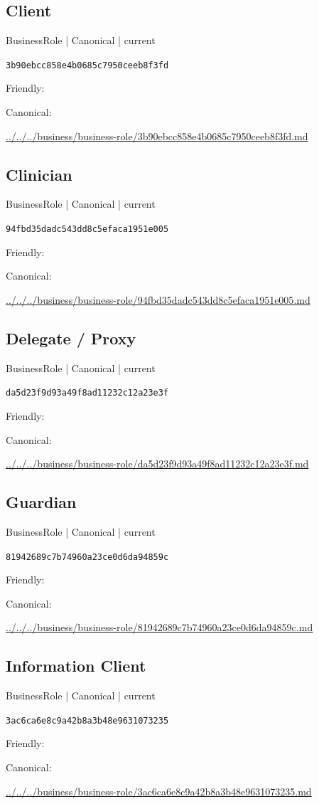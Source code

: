\documentclass[10pt,a4paper]{article}
\begin{document}
\subsection*{Client}
{\small BusinessRole | Canonical | current}\par
\texttt{3b90ebcc858e4b0685c7950ceeb8f3fd}\par
Friendly: \par
Canonical: \par
{\footnotesize\url{../../../business/business-role/3b90ebcc858e4b0685c7950ceeb8f3fd.md}}\par
\subsection*{Clinician}
{\small BusinessRole | Canonical | current}\par
\texttt{94fbd35dadc543dd8c5efaca1951e005}\par
Friendly: \par
Canonical: \par
{\footnotesize\url{../../../business/business-role/94fbd35dadc543dd8c5efaca1951e005.md}}\par
\subsection*{Delegate / Proxy}
{\small BusinessRole | Canonical | current}\par
\texttt{da5d23f9d93a49f8ad11232c12a23e3f}\par
Friendly: \par
Canonical: \par
{\footnotesize\url{../../../business/business-role/da5d23f9d93a49f8ad11232c12a23e3f.md}}\par
\subsection*{Guardian}
{\small BusinessRole | Canonical | current}\par
\texttt{81942689c7b74960a23ce0d6da94859c}\par
Friendly: \par
Canonical: \par
{\footnotesize\url{../../../business/business-role/81942689c7b74960a23ce0d6da94859c.md}}\par
\subsection*{Information Client}
{\small BusinessRole | Canonical | current}\par
\texttt{3ac6ca6e8c9a42b8a3b48e9631073235}\par
Friendly: \par
Canonical: \par
{\footnotesize\url{../../../business/business-role/3ac6ca6e8c9a42b8a3b48e9631073235.md}}\par
\end{document}
